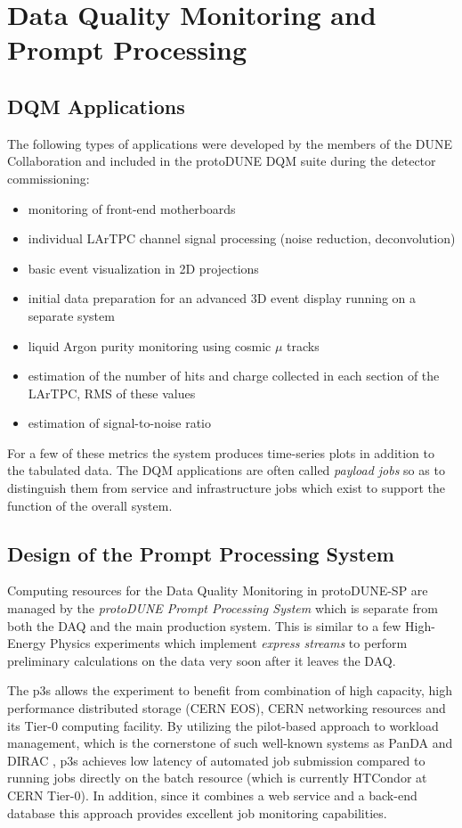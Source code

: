 \documentclass[pdftex,12pt,letter]{article}
\newcommand{\pd}{protoDUNE\xspace}
\begin{document}
\section{Data Quality Monitoring and Prompt Processing}
\subsection{DQM Applications}
The following types of applications were developed by the members of the DUNE Collaboration and
included in the \pd DQM suite during the detector
commissioning:
\begin{itemize}
\item monitoring of front-end motherboards
\item individual LArTPC channel signal processing (noise reduction, deconvolution)
\item basic event visualization in 2D projections
\item initial data preparation for an advanced 3D event display running on a separate system
\item liquid Argon purity monitoring using cosmic $\mu$ tracks
\item estimation of the number of hits and charge collected in each section of the LArTPC, RMS of these values
\item estimation of signal-to-noise ratio
\end{itemize}

\noindent For a few of these metrics the system produces time-series plots in addition to the tabulated data.
The DQM applications are often called \textit{payload jobs} so as to distinguish them from service and
infrastructure jobs which exist to support the function of the overall system.


\subsection{Design of the Prompt Processing System}

Computing resources for the Data Quality Monitoring in \pd-SP are managed by
the  \textit{\pd Prompt Processing System}
which is separate from both the DAQ and the main production system.
This is similar to a few High-Energy Physics experiments which implement
 \textit{express streams} to perform preliminary calculations on the data very soon
after it leaves the DAQ.

The  p3s allows the experiment to benefit from combination of high capacity, high
performance distributed storage (CERN EOS), CERN networking resources and its Tier-0 computing facility.
By utilizing the pilot-based approach \cite{eps} to workload management, which is the cornerstone of such well-known
systems as PanDA and DIRAC \cite{panda,dirac}, p3s achieves low latency of automated job submission
compared to running jobs directly on the batch resource (which is currently HTCondor at CERN Tier-0).
In addition, since it combines a web service and a back-end database this approach provides excellent
job monitoring capabilities.
\end{document}
